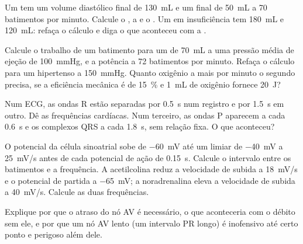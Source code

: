 \begin{exercise}[$\star\star$]\label{exo:b2:heart:5}
Um  tem um volume diastólico final de \qty{130}{mL} e um  final de \qty{50}{mL} a 70 batimentos por minuto. Calcule o
, a  e o . Um  em
insuficiência tem \qty{180}{mL} e \qty{120}{mL}: refaça o cálculo e diga
o que aconteceu com a .
\end{exercise}

\begin{exercise}[$\star\star$]\label{exo:b2:heart:6}
Calcule o trabalho de um batimento para um  de
\qty{70}{mL} a uma pressão média de ejeção de \qty{100}{mmHg}, e a
potência a 72 batimentos por minuto. Refaça o cálculo para um
hipertenso a \qty{150}{mmHg}. Quanto oxigênio a mais por minuto o
segundo  precisa, se a eficiência mecânica é de \qty{15}{\%} e
\qty{1}{mL} de oxigênio fornece \qty{20}{J}?
\end{exercise}

\begin{exercise}[$\star\star$]\label{exo:b2:heart:7}
Num ECG, as ondas R estão separadas por \qty{0.5}{s} num registro e por
\qty{1.5}{s} em outro. Dê as frequências cardíacas. Num terceiro, as
ondas P aparecem a cada \qty{0.6}{s} e os complexos QRS a cada
\qty{1.8}{s}, sem relação fixa. O que aconteceu?
\end{exercise}

\begin{exercise}[$\star\star$]\label{exo:b2:heart:8}
O potencial da célula sinoatrial sobe de \qty{-60}{mV} até um limiar de
\qty{-40}{mV} a \qty{25}{mV/s} antes de cada potencial de ação de
\qty{0.15}{s}. Calcule o intervalo entre os batimentos e a frequência.
A acetilcolina reduz a velocidade de subida a \qty{18}{mV/s} e o
potencial de partida a \qty{-65}{mV}; a noradrenalina eleva a velocidade
de subida a \qty{40}{mV/s}. Calcule as duas frequências.
\end{exercise}

\begin{exercise}[$\star\star$]\label{exo:b2:heart:9}
Explique por que o atraso do nó AV é necessário, o que aconteceria com o
débito sem ele, e por que um nó AV lento (um intervalo PR longo) é
inofensivo até certo ponto e perigoso além dele.
\end{exercise}


